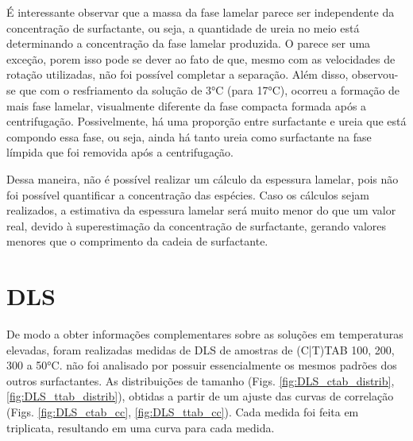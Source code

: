 	É interessante observar que a massa da fase lamelar parece ser independente da concentração de surfactante, ou seja, a quantidade de ureia no meio está determinando a concentração da fase lamelar produzida. O \CTAB{} parece ser uma exceção, porem isso pode se dever ao fato de que, mesmo com as velocidades de rotação utilizadas, não foi possível completar a separação. Além disso, observou-se que com o resfriamento da solução de 3°C (para 17°C), ocorreu a formação de mais fase lamelar, visualmente diferente da fase compacta formada após a centrifugação. Possivelmente, há uma proporção entre surfactante e ureia que está compondo essa fase, ou seja, ainda há tanto ureia como surfactante na fase límpida que foi removida após a centrifugação.
	
	Dessa maneira, não é possível realizar um cálculo da espessura lamelar, pois não foi possível quantificar a concentração das espécies. Caso os cálculos sejam realizados, a estimativa da espessura lamelar será muito menor do que um valor real, devido à superestimação da concentração de surfactante, gerando valores menores que o comprimento da cadeia de surfactante.
	\FloatBarrier
\section{DLS}
\label{sec:Ureia-DLS}

	De modo a obter informações complementares sobre as soluções em temperaturas elevadas, foram realizadas medidas de DLS de amostras de (C|T)TAB 100, 200, 300 \mM{} a 50°C. \DTAB{} não foi analisado por possuir essencialmente os mesmos padrões dos outros surfactantes. As distribuições de tamanho (Figs. \ref{fig:DLS_ctab_distrib}, \ref{fig:DLS_ttab_distrib}), obtidas a partir de um ajuste das curvas de correlação (Figs. \ref{fig:DLS_ctab_cc}, \ref{fig:DLS_ttab_cc}). Cada medida foi feita em triplicata, resultando em uma curva para cada medida.
	
